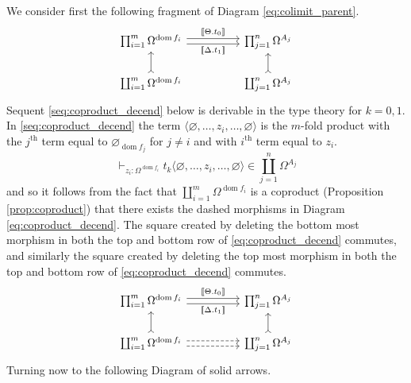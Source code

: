 \documentclass{birkjour}
\theoremstyle{plain}
\theoremstyle{definition}
\begin{document}
	We consider first the following fragment of Diagram \eqref{eq:colimit_parent}.
	\begin{equation}\label{eq:coproduct_parent}
		\begin{tikzcd}[column sep = huge]
			\prod_{i = 1}^m \Omega^{\operatorname{dom}f_i}\arrow[r,shift left, "{\llbracket\Theta.  t_0 \rrbracket}"]\arrow[r,swap,shift right,"{\llbracket \Delta. t_1\rrbracket}"] & \prod_{j = 1}^n\Omega^{A_j}\\
			\coprod_{i = 1}^m \Omega^{\operatorname{dom}f_i}\arrow[u,rightarrowtail] & \coprod_{j = 1}^n \Omega^{A_j}\arrow[u,rightarrowtail]
		\end{tikzcd}
	\end{equation}
	Sequent \eqref{seq:coproduct_decend} below is derivable in the type theory for $k = 0,1$. In \eqref{seq:coproduct_decend} the term $\langle \varnothing, \hdots, z_i, \hdots, \varnothing \rangle$ is the $m$-fold product with the $j^{\text{th}}$ term equal to $\varnothing_{\operatorname{dom}f_j}$ for $j \neq i$ and with $i^{\text{th}}$ term equal to $z_i$.
	\begin{equation}\label{seq:coproduct_decend}
		\vdash_{z_i : \Omega^{\operatorname{dom}f_i}} t_k\langle \varnothing, \hdots, z_i, \hdots, \varnothing \rangle \in \coprod_{j = 1}^n \Omega^{A_j}
	\end{equation}
	and so it follows from the fact that $\coprod_{i = 1}^m \Omega^{\operatorname{dom}f_i}$ is a coproduct (Proposition \ref{prop:coproduct}) that there exists the dashed morphisms in Diagram \eqref{eq:coproduct_decend}. The square created by deleting the bottom most morphism in both the top and bottom row of \eqref{eq:coproduct_decend} commutes, and similarly the square created by deleting the top most morphism in both the top and bottom row of \eqref{eq:coproduct_decend} commutes.
	\begin{equation}\label{eq:coproduct_decend}
		\begin{tikzcd}[column sep = huge]
			\prod_{i = 1}^m \Omega^{\operatorname{dom}f_i}\arrow[r,shift left, "{\llbracket\Theta.  t_0 \rrbracket}"]\arrow[r,swap,shift right,"{\llbracket \Delta. t_1\rrbracket}"] & \prod_{j = 1}^n\Omega^{A_j}\\
			\coprod_{i = 1}^m \Omega^{\operatorname{dom}f_i}\arrow[u,rightarrowtail]\arrow[r,dashed, shift left]\arrow[r,dashed, shift right] & \coprod_{j = 1}^n \Omega^{A_j}\arrow[u,rightarrowtail]
		\end{tikzcd}
	\end{equation}
	Turning now to the following Diagram of solid arrows.
\end{document}
